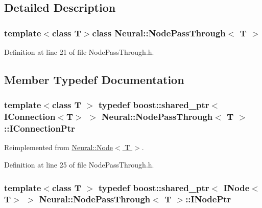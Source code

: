 \subsection{Detailed Description}
\subsubsection*{template$<$class T$>$class Neural::NodePassThrough$<$ T $>$}



Definition at line 21 of file NodePassThrough.h.



\subsection{Member Typedef Documentation}
\hypertarget{class_neural_1_1_node_pass_through_abad3481def64e79eb5d4c7e1a9155106}{
\subsubsection[{IConnectionPtr}]{\setlength{\rightskip}{0pt plus 5cm}template$<$class T $>$ typedef boost::shared\_\-ptr$<$ {\bf IConnection}$<$T$>$ $>$ {\bf Neural::NodePassThrough}$<$ T $>$::{\bf IConnectionPtr}}}
\label{class_neural_1_1_node_pass_through_abad3481def64e79eb5d4c7e1a9155106}


Reimplemented from \hyperlink{class_neural_1_1_node_ac797b836161befa12cd9897926139c14}{Neural::Node$<$ T $>$}.



Definition at line 25 of file NodePassThrough.h.

\hypertarget{class_neural_1_1_node_pass_through_a24652ff9763214e8e0d4a63c0cec169f}{
\subsubsection[{INodePtr}]{\setlength{\rightskip}{0pt plus 5cm}template$<$class T $>$ typedef boost::shared\_\-ptr$<$ {\bf INode}$<$T$>$ $>$ {\bf Neural::NodePassThrough}$<$ T $>$::{\bf INodePtr}}}
\label{class_neural_1_1_node_pass_through_a24652ff9763214e8e0d4a63c0cec169f}


